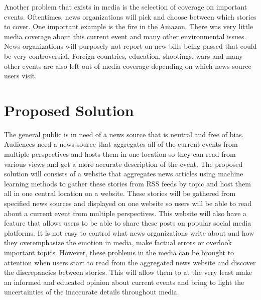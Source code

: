 \documentclass[onecolumn, draftclsnofoot,10pt, compsoc]{IEEEtran}
\begin{document}
Another problem that exists in media is the selection of coverage on important events.
 Oftentimes, news organizations will pick and choose between which stories to cover.
 One important example is the fire in the Amazon.
 There was very little media coverage about this current event and many other environmental issues.
 News organizations will purposely not report on new bills being passed that could be very controversial.
 Foreign countries, education, shootings, wars and many other events are also left out of media coverage depending on which news source users visit.

\section{Proposed Solution}

The general public is in need of a news source that is neutral and free of bias.
 Audiences need a news source that aggregates all of the current events from multiple perspectives and hosts them in one location so they can read from various views and get a more accurate description of the event.
 The proposed solution will consists of a website that aggregates news articles using machine learning methods to gather these stories from RSS feeds by topic and host them all in one central location on a website.
 These stories will be gathered from specified news sources and displayed on one website so users will be able to read about a current event from multiple perspectives.
 This website will also have a feature that allows users to be able to share these posts on popular social media platforms.
 It is not easy to control what news organizations write about and how they overemphasize the emotion in media, make factual errors or overlook important topics.
 However, these problems in the media can be brought to attention when users start to read from the aggregated news website and discover the discrepancies between stories.
 This will allow them to at the very least make an informed and educated opinion about current events and bring to light the uncertainties of the inaccurate details throughout media.
\end{document}
